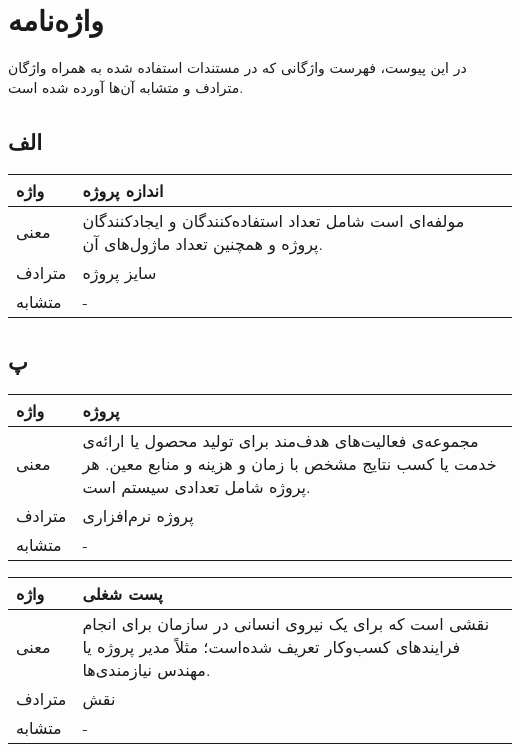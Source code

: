 
\chapter{واژه‌نامه}
در این پیوست، فهرست واژگانی که در مستندات استفاده شده به همراه واژگان مترادف  و متشابه آن‌ها آورده شده است.

\section*{الف}%
\begin{table}[H]
	\centering
	\begin{tabular}{| p{1.5cm} | p{5cm} |}
		\hline
		واژه & اندازه پروژه \\
		\hline
		معنی  & مولفه‌ای است شامل تعداد استفاده‌کنندگان و ایجادکنندگان پروژه و همچنین تعداد ماژول‌های آن. \\
		\hline
		مترادف & سایز پروژه \\
		\hline
		متشابه  & - \\
		\hline
	\end{tabular}
\end{table}

\section*{پ}%
\begin{table}[H]
	\centering
	\begin{tabular}{| p{1.5cm} | p{5cm} |}
		\hline
		واژه & پروژه \\
		\hline
		معنی  & مجموعه‌ی فعالیت‌های هدف‌مند برای تولید محصول یا ارائه‌ی خدمت یا کسب نتایج مشخص با زمان و هزینه و منابع معین. هر پروژه شامل تعدادی سیستم است. \\
		\hline
		مترادف & پروژه نرم‌افزاری \\
		\hline
		متشابه  & - \\
		\hline
	\end{tabular}
\end{table}

\begin{table}[H]
	\centering
	\begin{tabular}{| p{1.5cm} | p{5cm} |}
		\hline
		واژه & پست شغلی \\
		\hline
		معنی  & نقشی است که برای یک نیروی انسانی در سازمان برای انجام فرایندهای کسب‌وکار تعریف شده‌است؛ مثلاً مدیر پروژه یا مهندس نیازمندی‌ها. \\
		\hline
		مترادف & نقش \\
		\hline
		متشابه  & - \\
		\hline
	\end{tabular}
\end{table}

